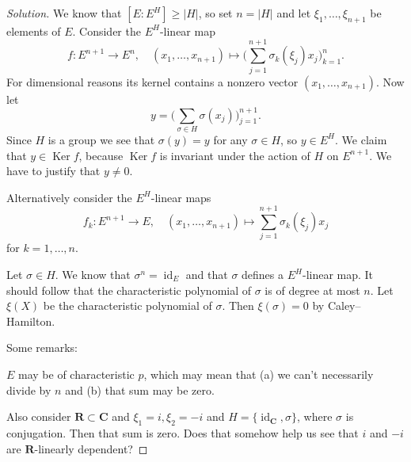 \documentclass[11pt]{amsart}
\theoremstyle{definition}
\newenvironment{s}{\begin{proof}[Solution]}{\end{proof}}
\def\CC{\mathbf{C}}
\def\RR{\mathbf{R}}
\DeclareMathOperator{\id}{id}
\DeclareMathOperator{\Ker}{Ker}
\begin{document}
\begin{s}
We know that $[E:E^H] \geq |H|$, so set $n = |H|$ and let $\xi_1,\ldots,\xi_{n+1}$ be elements of $E$.
Consider the $E^H$-linear map
\[
f : E^{n+1} \longrightarrow E^n,
\quad
(x_1, \ldots, x_{n+1}) 
\mapsto \biggl( \sum_{j=1}^{n+1} \sigma_k(\xi_j) x_j \biggr)_{k=1}^n.
\]
For dimensional reasons its kernel contains a nonzero vector $(x_1, \ldots, x_{n+1})$.
Now let
\[
y = \biggl(
\sum_{\sigma \in H} \sigma(x_j)
\biggr)_{j=1}^{n+1}.
\]
Since $H$ is a group we see that $\sigma(y) = y$ for any $\sigma \in H$, so $y \in E^H$.
We claim that $y \in \Ker f$, because $\Ker f$ is invariant under the action of $H$ on $E^{n+1}$.
We have to justify that $y \not= 0$.

Alternatively consider the $E^H$-linear maps
\[
f_k : E^{n+1} \longrightarrow E,
\quad
(x_1, \ldots, x_{n+1}) 
\mapsto \sum_{j=1}^{n+1} \sigma_k(\xi_j) x_j
\]
for $k = 1, \ldots, n$.


Let $\sigma \in H$.
We know that $\sigma^n = \id_E$ and that $\sigma$ defines a $E^H$-linear map.
It should follow that the characteristic polynomial of $\sigma$ is of degree at most $n$.
Let $\xi(X)$ be the characteristic polynomial of $\sigma$.
Then $\xi(\sigma) = 0$ by Caley--Hamilton.



Some remarks:

$E$ may be of characteristic $p$, which may mean that (a) we can't necessarily divide by $n$ and (b) that sum may be zero.

Also consider $\RR \subset \CC$ and $\xi_1 = i, \xi_2 = -i$ and $H = \{\id_{\CC}, \sigma\}$, where $\sigma$ is conjugation.
Then that sum is zero.
Does that somehow help us see that $i$ and $-i$ are $\RR$-linearly dependent?
\end{s}
\end{document}

